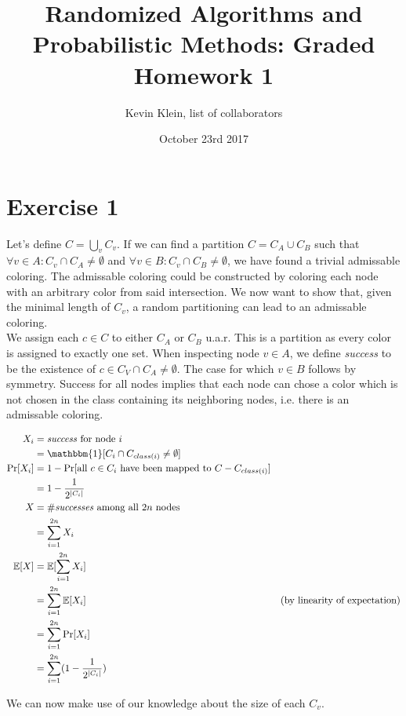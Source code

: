 \documentclass[a4paper,german]{article}
\title{Randomized Algorithms and Probabilistic Methods: Graded Homework 1}
\author{ Kevin Klein, list of collaborators}
\date{October 23rd 2017}
\begin{document}
\maketitle

\section*{Exercise 1}
Let's define \(C = \bigcup_{v} C_v\). If we can find a partition \(C = C_A \cup C_B\) such that \(\forall v \in A: C_v \cap C_A \neq \emptyset \) and \(\forall v \in B: C_v \cap C_B \neq \emptyset \), we have found a trivial admissable coloring. The admissable coloring could be constructed by coloring each node with an arbitrary color from said intersection.
We now want to show that, given the minimal length of \(C_v\), a random partitioning can lead to an admissable coloring. \\

We assign each \(c \in C\) to either \(C_A\) or \(C_B\) u.a.r. This is a partition as every color is assigned to exactly one set. 
When inspecting node \(v \in A\), we define \emph{success} to be the existence of \(c \in C_V \cap C_A \neq \emptyset\). The case for which \(v \in B\) follows by symmetry. Success for all nodes implies that each node can chose a color which is not chosen in the class containing its neighboring nodes, i.e. there is an admissable coloring. 

\begin{align*} X_i &= \text{\emph{success} for node } i  \\
&= \mathbbm{1}[C_i \cap C_{class(i)} \neq \emptyset] \\
\Pr[X_i] &= 1 - \Pr[\text{all } c \in C_i \text{ have been mapped to } C - C_{class(i)}] \\
 &= 1 - \frac{1}{{2}^{|C_i|}} \\
 X &= \text{\#\emph{successes} among all } 2n \text{ nodes}\\
 &= \sum_{i=1}^{2n} X_i \\
 \mathbb{E}[X] &= \mathbb{E}[\sum_{i=1}^{2n} X_i ]\\
 &= \sum_{i=1}^{2n} \mathbb{E}[X_i ] & \text{(by linearity of expectation)} \\
 &=  \sum_{i=1}^{2n} \Pr[X_i ] \\
&=  \sum_{i=1}^{2n} (1 - \frac{1}{{2}^{|C_i|}}) 
\end{align*}

We can now make use of our knowledge about the size of each \(C_v\).
\end{document}
